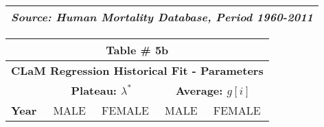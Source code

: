 \documentclass[12pt, titlepage]{article}%
\begin{document}
\begin{table}
\begin{center}
\begin{tabular}{||l||c|c||c|c||}
\multicolumn{5}{||r||}{{\em Source: Human Mortality Database, Period 1960-2011}} \\ \hline\hline
\end{tabular}
\label{lab2}
\smallskip
\end{center}
\end{table}

\begin{table}
  \begin{center}
  \begin{tabular}{||l||c|c||c|c||}
  \hline\hline
  \multicolumn{5}{||c||}{Table \# 5b } \\ \hline\hline
  \multicolumn{5}{||c||}{{\bf CLaM Regression Historical Fit - Parameters}} \\ \hline\hline
  
  { } & 
  \multicolumn{2}{||c||}{ \bf Plateau: $\lambda^{*}$ } & 
  \multicolumn{2}{||c||}{ \bf Average: $g[i]$ } \\ \hline\hline
  
  {\bf Year } &
  {MALE} & {FEMALE} &
  {MALE} & {FEMALE} \\ \hline\hline


\end{tabular}
\end{center}
\end{table}
\end{document}
